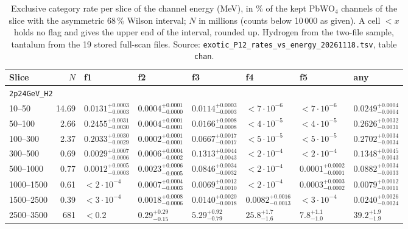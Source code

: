 \documentclass[11pt]{article}
\newcommand{\code}[1]{\texttt{#1}}
\begin{document}
\begin{table}[htbp]
\centering
\caption{Exclusive category rate per slice of the channel energy (MeV), in \% of the kept PbWO$_4$ channels of the slice with the asymmetric 68\,\% Wilson interval; $N$ in millions (counts below 10\,000 as given). A cell $<x$ holds no flag and gives the upper end of the interval, rounded up. Hydrogen from the two-file sample, tantalum from the 19 stored full-scan files. Source: \code{exotic\_P12\_rates\_vs\_energy\_20261118.tsv}, table \code{chan}.}
\label{tab:exotic_slices}
\scriptsize
\setlength{\tabcolsep}{3.5pt}
\begin{tabular}{lrllllll}
\toprule
Slice & $N$ & f1 & f2 & f3 & f4 & f5 & any \\
\midrule
\multicolumn{8}{l}{\code{2p24GeV\_H2}} \\
10--50 & 14.69 & $0.0131^{+0.0003}_{-0.0003}$ & $0.0004^{+0.0001}_{-0.0000}$ & $0.0114^{+0.0003}_{-0.0003}$ & $<7{\cdot}10^{-6}$ & $<7{\cdot}10^{-6}$ & $0.0249^{+0.0004}_{-0.0004}$ \\
50--100 & 2.66 & $0.2455^{+0.0031}_{-0.0030}$ & $0.0004^{+0.0001}_{-0.0001}$ & $0.0166^{+0.0008}_{-0.0008}$ & $<4{\cdot}10^{-5}$ & $<4{\cdot}10^{-5}$ & $0.2626^{+0.0032}_{-0.0031}$ \\
100--300 & 2.37 & $0.2033^{+0.0030}_{-0.0029}$ & $0.0002^{+0.0001}_{-0.0001}$ & $0.0667^{+0.0017}_{-0.0017}$ & $<5{\cdot}10^{-5}$ & $<5{\cdot}10^{-5}$ & $0.2702^{+0.0034}_{-0.0034}$ \\
300--500 & 0.69 & $0.0029^{+0.0007}_{-0.0006}$ & $0.0006^{+0.0004}_{-0.0002}$ & $0.1313^{+0.0044}_{-0.0043}$ & $<2{\cdot}10^{-4}$ & $<2{\cdot}10^{-4}$ & $0.1348^{+0.0045}_{-0.0043}$ \\
500--1000 & 0.77 & $0.0012^{+0.0005}_{-0.0003}$ & $0.0023^{+0.0006}_{-0.0005}$ & $0.0846^{+0.0034}_{-0.0032}$ & $<2{\cdot}10^{-4}$ & $0.0001^{+0.0002}_{-0.0001}$ & $0.0882^{+0.0034}_{-0.0033}$ \\
1000--1500 & 0.61 & $<2{\cdot}10^{-4}$ & $0.0007^{+0.0004}_{-0.0003}$ & $0.0069^{+0.0012}_{-0.0010}$ & $<2{\cdot}10^{-4}$ & $0.0003^{+0.0003}_{-0.0002}$ & $0.0079^{+0.0012}_{-0.0011}$ \\
1500--2500 & 0.39 & $<3{\cdot}10^{-4}$ & $0.0018^{+0.0008}_{-0.0006}$ & $0.0140^{+0.0020}_{-0.0018}$ & $0.0082^{+0.0016}_{-0.0013}$ & $<3{\cdot}10^{-4}$ & $0.0240^{+0.0026}_{-0.0024}$ \\
2500--3500 & 681 & $<0.2$ & $0.29^{+0.29}_{-0.15}$ & $5.29^{+0.92}_{-0.79}$ & $25.8^{+1.7}_{-1.6}$ & $7.8^{+1.1}_{-1.0}$ & $39.2^{+1.9}_{-1.9}$ \\

\end{tabular}
\end{table}
\end{document}
